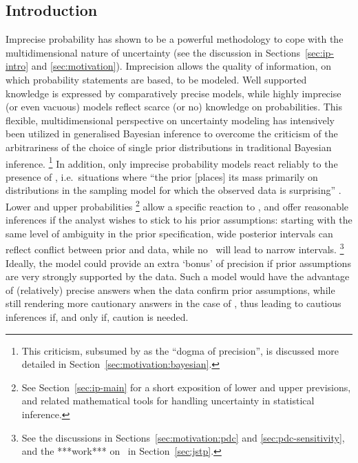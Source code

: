 \subsection{Introduction}
\label{sec:isipta11-intro}

Imprecise probability has shown to be a
powerful methodology to cope with the multidimensional nature of
uncertainty (see the discussion in Sections~\ref{sec:ip-intro} and \ref{sec:motivation}).
Imprecision allows the quality of information, on which probability statements are
based, to be modeled. Well supported knowledge is expressed by comparatively
precise models, while highly imprecise (or even vacuous) models reflect scarce (or no) knowledge
on probabilities. This flexible, multidimensional perspective on uncertainty
modeling has intensively been utilized in generalised Bayesian
inference to overcome the criticism of the arbitrariness of
the choice of single prior distributions in traditional Bayesian inference.%
\footnote{%
This criticism, subsumed by \textcite[\S 5]{1991:walley} as the ``dogma of precision'',
is discussed more detailed in Section~\ref{sec:motivation:bayesian}.}
In addition, only imprecise probability models react reliably to the presence of
\pdc, i.e.\ situations  where ``the prior [places] its mass primarily on
distributions in the sampling model for which the observed data is
surprising'' \parencite[p.~894]{2006:evans}. Lower and upper probabilities%
\footnote{See Section~\ref{sec:ip-main} for a short exposition of lower and upper previsions,
and related mathematical tools for handling uncertainty in statistical inference.}
allow a specific reaction to \pdc, and offer reasonable inferences if the analyst wishes to
stick to his prior assumptions: starting with the same level of ambiguity in the prior
specification, wide posterior intervals can
reflect conflict between prior and data, while
no \pdc\ will lead to narrow intervals.%
\footnote{See the discussions in Sections~\ref{sec:motivation:pdc} and \ref{sec:pdc-sensitivity},
and the ***work*** on \pdc\ in Section~\ref{sec:jstp}.}
Ideally, the model could provide an extra `bonus' of precision if prior %
assumptions are very strongly supported by the data.
Such a model would have the advantage
of (relatively) precise answers when the data confirm prior assumptions,
while still rendering more cautionary answers in the case of \pdc,
thus leading to cautious inferences if, and only if, caution is needed.

